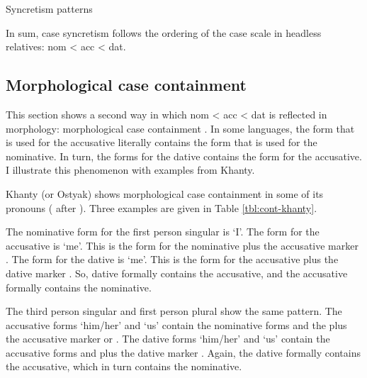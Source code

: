 \begin{table}[H]
  \center
  \caption {Syncretism patterns}
    
  \label{tbl:syncretisms}
\end{table}

In sum, case syncretism follows the ordering of the case scale in headless relatives: \ac{nom} < \ac{acc} < \ac{dat}.


\subsection{Morphological case containment}

This section shows a second way in which \ac{nom} < \ac{acc} < \ac{dat} is reflected in morphology: morphological case containment \citep[cf.][]{smith2019,zompi2017,caha2010}. In some languages, the form that is used for the accusative literally contains the form that is used for the nominative. In turn, the forms for the dative contains the form for the accusative. I illustrate this phenomenon with examples from Khanty.

Khanty (or Ostyak) shows morphological case containment in some of its pronouns ( after \citealt{smith2019}). Three examples are given in Table \ref{tbl:cont-khanty}.

The nominative form for the first person singular is  `I'. The form for the accusative is  `me'. This is the form for the nominative  plus the accusative marker . The form for the dative is  `me'. This is the form for the accusative  plus the dative marker . So, dative formally contains the accusative, and the accusative formally contains the nominative.

The third person singular and first person plural show the same pattern. The accusative forms  `him/her' and  `us' contain the nominative forms  and the  plus the accusative marker  or . The dative forms  `him/her' and  `us' contain the accusative forms  and  plus the dative marker . Again, the dative formally contains the accusative, which in turn contains the nominative.

